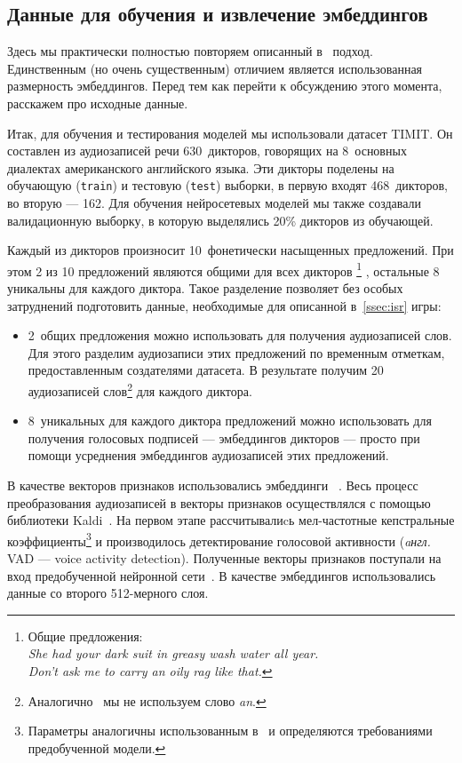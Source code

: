 \subsection{Данные для обучения и извлечение эмбеддингов}

Здесь мы практически полностью повторяем описанный в~\cite{isrpaper} подход.
Единственным (но очень существенным) отличием является использованная размерность
эмбеддингов. Перед тем как перейти к обсуждению этого момента, расскажем про
исходные данные.

Итак, для обучения и тестирования моделей мы использовали датасет
TIMIT\cite{timit}. Он составлен из аудиозаписей речи 630~дикторов, говорящих на
8~основных диалектах американского английского языка. Эти дикторы поделены на
обучающую (\texttt{train}) и тестовую (\texttt{test}) выборки, в первую входят
468~дикторов, во вторую --- 162. Для обучения нейросетевых моделей мы также
создавали валидационную выборку, в которую выделялись 20\% дикторов из обучающей.

Каждый из дикторов произносит 10~фонетически насыщенных предложений. При этом 2
из 10 предложений являются общими для всех дикторов
\footnote{Общие предложения:\\
          \textit{She had your dark suit in greasy wash water all year.}\\
          \textit{Don't ask me to carry an oily rag like that.}}
, остальные 8 уникальны для каждого диктора. Такое разделение позволяет без
особых затруднений подготовить данные, необходимые для описанной
в~\ref{ssec:isr} игры:
\begin{itemize}
    \item 2~общих предложения можно использовать для получения аудиозаписей
    слов.  Для этого разделим аудиозаписи этих предложений по временным
    отметкам, предоставленным создателями датасета. В результате получим 20
    аудиозаписей слов\footnote{Аналогично~\cite{isrpaper} мы не используем слово
    \textit{an}.} для каждого диктора.
    \item 8~уникальных для каждого диктора предложений можно использовать для
    получения голосовых подписей --- эмбеддингов дикторов --- просто при помощи
    усреднения эмбеддингов аудиозаписей этих предложений.
\end{itemize}

В качестве векторов признаков использовались эмбеддинги
\xvector{}~\cite{xvectorspaper}. Весь процесс преобразования аудиозаписей в
векторы признаков осуществлялся с помощью библиотеки Kaldi~\cite{kaldi}. На
первом этапе рассчитывалиcь мел-частотные кепстральные коэффициенты\footnote{
Параметры аналогичны использованным в~\cite{isrpaper} и определяются
требованиями предобученной модели.} и производилось детектирование голосовой
активности (\textit{aнгл.} VAD --- voice activity detection). Полученные векторы
признаков поступали на вход предобученной нейронной сети~\cite{sre16model}. В
качестве эмбеддингов использовались данные со второго 512-мерного слоя.

